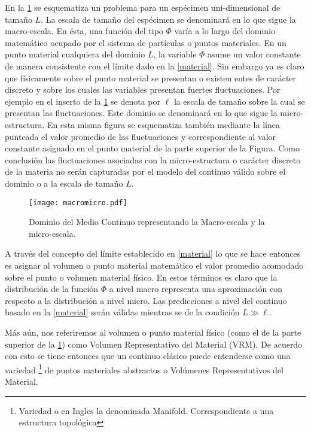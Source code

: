 \documentclass[../notas medios.tex]{subfiles}
\begin{document}
En la \cref{macromicro} se esquematiza un problema para un espécimen
uni-dimensional de tamaño $L$.  La escala de tamaño del espécimen se denominará en lo que sigue la macro-escala.  En ésta, una función del tipo $\Phi$ varía a lo largo del dominio matemático ocupado por el sistema de partículas o puntos materiales.  En un punto material cualquiera del dominio $L$, la variable $\Phi$ asume un valor constante de manera consistente con el límite dado en la \cref{material}. Sin embargo ya es claro que físicamente sobre el punto material se presentan o existen entes de carácter discreto y sobre los cuales las variables presentan fuertes fluctuaciones.  Por ejemplo en el inserto de la \cref{macromicro} se denota por $\ell$ la escala de tamaño sobre la cual se presentan las fluctuaciones.  Este dominio se denominará en lo que sigue la micro-estructura.  En esta misma figura se esquematiza también mediante la línea punteada el valor promedio de las fluctuaciones y correspondiente al valor constante asignado en el punto material de la parte superior de la Figura.  Como conclusión las fluctuaciones asociadas con la micro-estructura o carácter discreto de la materia no serán capturadas por el modelo del continuo válido sobre el dominio o a la escala de tamaño $L$.

\begin{figure}[H]
\centering
	\texttt{[image: macromicro.pdf]}
	\caption{Dominio del Medio Continuo representando la Macro-escala y la micro-escala.}
	\label{macromicro}
\end{figure}


A través del concepto del límite establecido en \cref{material} lo que se hace entonces es asignar al volumen o punto material matemático el valor promedio acomodado sobre el punto o volumen material físico.  En estos términos es claro que la distribución de la función $\Phi$ a nivel macro representa una aproximación con respecto a la distribución a nivel micro.  Las predicciones a nivel del continuo basado en la \cref{material} serán válidas mientras se de la condición $L \gg \ell $.

Más aún, nos referiremos al volumen o punto material físico (como el de la parte superior de la \cref{macromicro}) como Volumen Representativo del Material (VRM).  De acuerdo con esto se tiene entonces que un continuo clásico puede entenderse como una variedad \footnote{Variedad o en Ingles la denominada Manifold.  Correspondiente a una estructura topológica} de puntos materiales abstractos o Volúmenes Representativos del Material.
\end{document}
